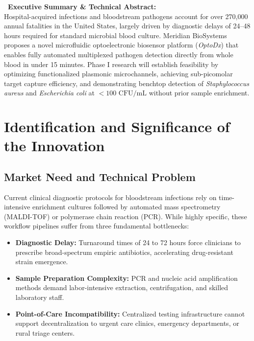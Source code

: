 \documentclass[11pt,a4paper]{scrartcl}
\begin{document}
\par\vspace{2pt}

\begin{tcolorbox}[highlightbox]
\small
\textbf{\faFlask\ Executive Summary \& Technical Abstract:}\\
Hospital-acquired infections and bloodstream pathogens account for over 270,000 annual fatalities in the United States, largely driven by diagnostic delays of 24--48 hours required for standard microbial blood culture. Meridian BioSystems proposes a novel microfluidic optoelectronic biosensor platform (\emph{OptoDx}) that enables fully automated multiplexed pathogen detection directly from whole blood in under 15 minutes. Phase I research will establish feasibility by optimizing functionalized plasmonic microchannels, achieving sub-picomolar target capture efficiency, and demonstrating benchtop detection of \emph{Staphylococcus aureus} and \emph{Escherichia coli} at $< 100\text{ CFU/mL}$ without prior sample enrichment.
\end{tcolorbox}

\section{Identification and Significance of the Innovation}

\subsection{Market Need and Technical Problem}
Current clinical diagnostic protocols for bloodstream infections rely on time-intensive enrichment cultures followed by automated mass spectrometry (MALDI-TOF) or polymerase chain reaction (PCR). While highly specific, these workflow pipelines suffer from three fundamental bottlenecks:
\begin{itemize}
    \item \textbf{Diagnostic Delay:} Turnaround times of 24 to 72 hours force clinicians to prescribe broad-spectrum empiric antibiotics, accelerating drug-resistant strain emergence.
    \item \textbf{Sample Preparation Complexity:} PCR and nucleic acid amplification methods demand labor-intensive extraction, centrifugation, and skilled laboratory staff.
    \item \textbf{Point-of-Care Incompatibility:} Centralized testing infrastructure cannot support decentralization to urgent care clinics, emergency departments, or rural triage centers.
\end{itemize}
\end{document}
